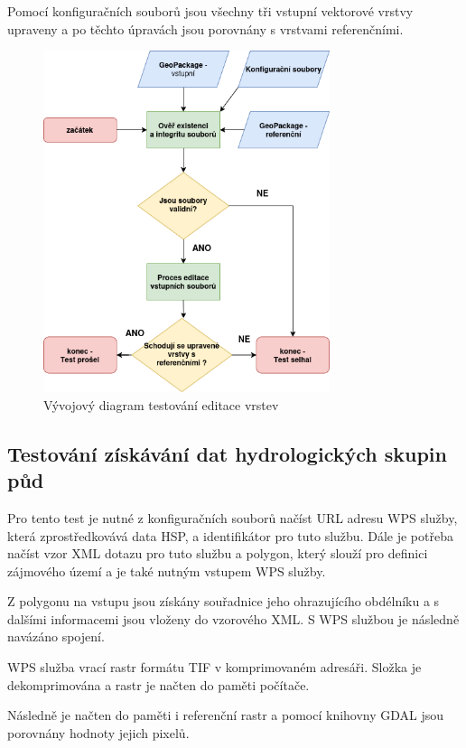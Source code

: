 \documentclass[a4paper,oneside,12pt]{book}
\begin{document}
\hspace{10mm} Pomocí konfiguračních souborů jsou všechny tři vstupní vektorové vrstvy upraveny a po těchto úpravách jsou porovnány s vrstvami referenčními. 

\begin{figure}[H] \label{obr19}
\centering
\includegraphics[height=10cm]{pictures/test2.png}
\caption{Vývojový diagram testování editace vrstev}
\label{fig:test2}
\end{figure}


\subsection{Testování získávání dat hydrologických skupin půd} \label{test_soil}
\hspace{10mm} Pro tento test je nutné z konfiguračních souborů načíst URL adresu WPS služby, která zprostředkovává data HSP, a identifikátor pro tuto službu. Dále je potřeba načíst vzor XML dotazu pro tuto službu a polygon, který slouží pro definici zájmového území a je také nutným vstupem WPS služby.

\hspace{10mm} Z polygonu na vstupu jsou získány souřadnice jeho ohrazujícího obdélníku a s dalšími informacemi jsou vloženy do vzorového XML. S WPS službou je následně navázáno spojení.

\hspace{10mm} WPS služba vrací rastr formátu TIF v komprimovaném adresáři. Složka je dekomprimována a rastr je načten do paměti počítače.

\hspace{10mm} Následně je načten do paměti i referenční rastr a pomocí knihovny GDAL jsou porovnány hodnoty jejich pixelů.
\end{document}
